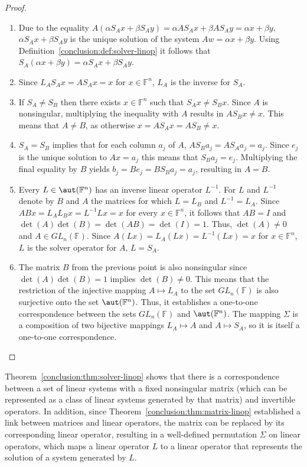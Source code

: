 \begin{proof}~\\
\begin{enumerate}
\item Due to the equality $A(\alpha S_A x + \beta S_A y) = \alpha A S_A x +
\beta A S_A y = \alpha x + \beta y$, $\alpha S_A x + \beta S_A y$ is the
unique solution of the system $Aw = \alpha x + \beta y$. Using
Definition~\ref{conclusion:def:solver-linop} it follows that $S_A(\alpha x +
\beta y) = \alpha S_A x + \beta S_A y$.
\item Since $L_A S_A x = A S_A x = x$ for $x \in \mathbb{F}^n$, $L_A$ is the
inverse for $S_A$.
\item If $S_A \neq S_B$ then there exists $x \in \mathbb{F}^n$ such that $S_A x
\neq S_B x$. Since $A$ is nonsingular, multiplying the inequality with $A$
results in $A S_B x \neq x$. This means that $A \neq B$, as otherwise $x = A S_A
x = A S_B \neq x$.
\item $S_A = S_B$ implies that for each column $a_j$ of $A$, $A S_B a_j = A S_A
a_j = a_j$. Since $e_j$ is the unique solution to $Ax = a_j$ this means that
$S_B a_j = e_j$. Multiplying the final equality by $B$ yields $b_j = B e_j = B
S_B a_j = a_j$, resulting in $A = B$.
\item Every $L \in \aut(\mathbb{F}^n)$ has an inverse linear operator $L^{-1}$.
For $L$ and $L^{-1}$ denote by $B$ and $A$ the matrices for which $L = L_B$ and
$L^{-1} = L_A$. Since $ABx = L_A L_B x = L^{-1}Lx = x$ for every
$x \in \mathbb{F}^n$, it follows that $AB = I$ and $\det(A)\det(B) = \det(AB) =
\det(I) = 1$. Thus, $\det(A) \neq 0$ and $A \in GL_n(\mathbb{F})$. Since $A(Lx)
= L_A(Lx) = L^{-1}(Lx) = x$ for $x \in \mathbb{F}^n$, $L$ is the solver operator
for $A$, \ie $L = S_A$.
\item The matrix $B$ from the previous point is also nonsingular since
$\det(A)\det(B) = 1$ implies $\det(B) \neq 0$. This means that the restriction
of the injective mapping $A \mapsto L_A$ to the set $GL_n(\mathbb{F})$ is also
surjective onto the set $\aut(\mathbb{F}^n)$. Thus, it establishes a one-to-one
correspondence between the sets $GL_n(\mathbb{F})$ and $\aut(\mathbb{F}^n)$.
The mapping $\Sigma$ is a composition of two bijective mappings $L_A
\mapsto A$ and $A \mapsto S_A$, so it is itself a one-to-one correspondence.
\end{enumerate}
\end{proof}

Theorem~\ref{conclusion:thm:solver-linop} shows that there is a correspondence
between a set of linear systems with a fixed nonsingular matrix (which can be
represented as a class of linear systems generated by that matrix) and
invertible operators.  In addition, since
Theorem~\ref{conclusion:thm:matrix-linop} established a link between matrices
and linear operators, the matrix can be replaced by its corresponding linear
operator, resulting in a well-defined permutation $\Sigma$ on linear operators,
which maps a linear operator $L$ to a linear operator that represents the
solution of a system generated by $L$.

